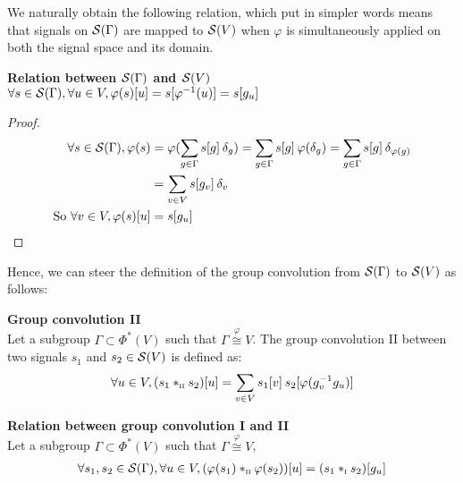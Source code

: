We naturally obtain the following relation, which put in simpler words means that signals on $\cs(\Gamma)$ are mapped to $\cs(V)$ when $\varphi$ is simultaneously applied on both the signal space and its domain.

\begin{lemma}\textbf{Relation between $\cs(\Gamma)$ and $\cs(V)$}\\
$\forall s \in \cs(\Gamma), \forall u \in V, \varphi(s)[u] = s[\varphi^{-1}(u)] = s[g_u]$
\label{lem:outer}
\end{lemma}

\begin{proof}
\begin{align*}
\forall s \in \cs(\Gamma), \varphi(s) & = \varphi(\displaystyle \sum_{g \in \Gamma} s[g] \h{2} \delta_g)
 = \displaystyle \sum_{g \in \Gamma} s[g] \h{2} \varphi(\delta_g)
 = \displaystyle \sum_{g \in \Gamma} s[g] \h{2} \delta_{\varphi(g)}\\
 & = \displaystyle \sum_{v \in V} s[g_v] \h{2} \delta_v\\
 \text{So }\forall v \in V, \varphi(s) [u] & = s[g_u]
\end{align*}
\end{proof}

Hence, we can steer the definition of the group convolution from $\cs(\Gamma)$ to $\cs(V)$ as follows:

\begin{definition}\textbf{Group convolution II}\\
Let a subgroup $\Gamma \subset \Phi^*(V)$ such that $\Gamma \overset{\varphi}{\cong} V$.
The group convolution II between two signals $s_1$ and $s_2 \in \cs(V)$ is defined as:
\begin{gather*}
\forall u \in V, (s_1 \ast_{\II} s_2) [u] = \displaystyle \sum_{v \in V} s_1[v] \h{2} s_2[\varphi(g_v^{-1}g_u)]
\end{gather*}
\label{def:conv2}
\end{definition}

\begin{lemma}\textbf{Relation between group convolution I and II}\\
Let a subgroup $\Gamma \subset \Phi^*(V)$ such that $\Gamma \overset{\varphi}{\cong} V$,
\begin{gather*}
\forall s_1, s_2 \in \cs(\Gamma), \forall u \in V,
(\varphi(s_1) \ast_{\II} \varphi(s_2))[u] = (s_1 \ast_{\I} s_2)[g_u]
\end{gather*}
\label{lem:rel12}
\end{lemma}

